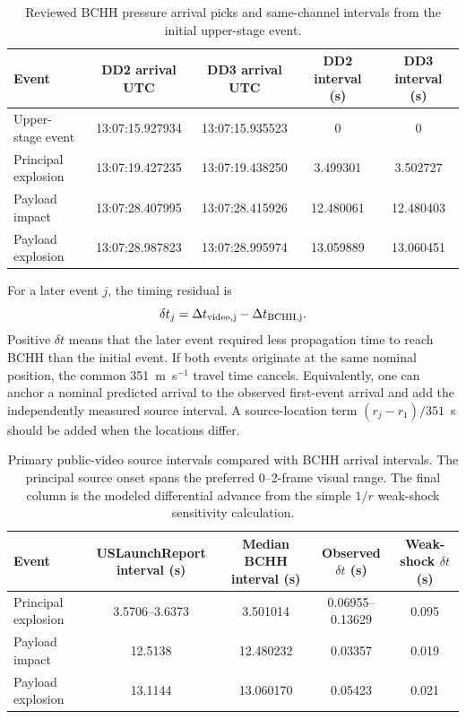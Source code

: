 \documentclass[]{seismica}
\begin{document}
\begin{table}[!tbp]
\centering
\caption{Reviewed BCHH pressure arrival picks and same-channel intervals from
the initial upper-stage event.}
\label{tab:supp_receiver_picks}
\begin{tabularx}{\textwidth}{Xcccc}
\hline
Event & DD2 arrival UTC & DD3 arrival UTC & DD2 interval (s) & DD3 interval (s) \\
\hline
Upper-stage event & 13:07:15.927934 & 13:07:15.935523 & 0 & 0 \\
Principal explosion & 13:07:19.427235 & 13:07:19.438250 & 3.499301 & 3.502727 \\
Payload impact & 13:07:28.407995 & 13:07:28.415926 & 12.480061 & 12.480403 \\
Payload explosion & 13:07:28.987823 & 13:07:28.995974 & 13.059889 & 13.060451 \\
\hline
\end{tabularx}
\end{table}

For a later event $j$, the timing residual is
\begin{equation}
 \delta t_j=\Delta t_{\rm video,j}-\Delta t_{\rm BCHH,j}.
\end{equation}
Positive $\delta t$ means that the later event required less propagation time
to reach BCHH than the initial event. If both events originate at the same
nominal position, the common 351~m~s$^{-1}$ travel time cancels. Equivalently,
one can anchor a nominal predicted arrival to the observed first-event arrival
and add the independently measured source interval. A source-location term
$(r_j-r_1)/351$~s should be added when the locations differ.

\begin{table}[!tbp]
\centering
\caption{Primary public-video source intervals compared with BCHH arrival
intervals. The principal source onset spans the preferred 0--2-frame visual
range. The final column is the modeled differential advance from the simple
$1/r$ weak-shock sensitivity calculation.}
\label{tab:supp_timing_comparison}
\begin{tabularx}{\textwidth}{Xcccc}
\hline
Event & USLaunchReport interval (s) & Median BCHH interval (s) & Observed $\delta t$ (s) & Weak-shock $\delta t$ (s) \\
\hline
Principal explosion & 3.5706--3.6373 & 3.501014 & 0.06955--0.13629 & 0.095 \\
Payload impact & 12.5138 & 12.480232 & 0.03357 & 0.019 \\
Payload explosion & 13.1144 & 13.060170 & 0.05423 & 0.021 \\
\hline
\end{tabularx}
\end{table}
\end{document}
